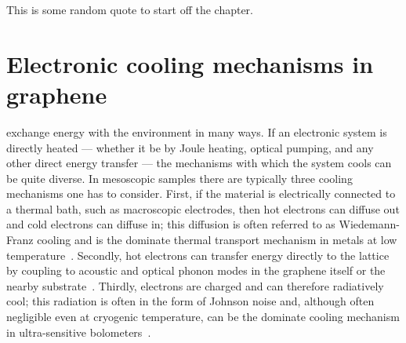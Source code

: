 \begin{savequote}[75mm]
This is some random quote to start off the chapter.
\end{savequote}

\chapter{Electronic cooling mechanisms in graphene}
\label{ch:electronic_cooling}
 exchange energy with the environment in many ways. If an electronic system is directly heated --- whether it be by Joule heating, optical pumping, and any other direct energy transfer --- the mechanisms with which the system cools can be quite diverse. In mesoscopic samples there are typically three cooling mechanisms one has to consider. First, if the material is electrically connected to a thermal bath, such as macroscopic electrodes, then hot electrons can diffuse out and cold electrons can diffuse in; this diffusion is often referred to as Wiedemann-Franz cooling and is the dominate thermal transport mechanism in metals at low temperature~\cite{ashcroft_solid_1976, kittel_introduction_2004}. Secondly, hot electrons can transfer energy directly to the lattice by coupling to acoustic and optical phonon modes in the graphene itself or the nearby substrate~\cite{??}. Thirdly, electrons are charged and can therefore radiatively cool; this radiation is often in the form of Johnson noise and, although often negligible even at cryogenic temperature, can be the dominate cooling mechanism in ultra-sensitive bolometers~\cite{prober, mckitterick??}.


